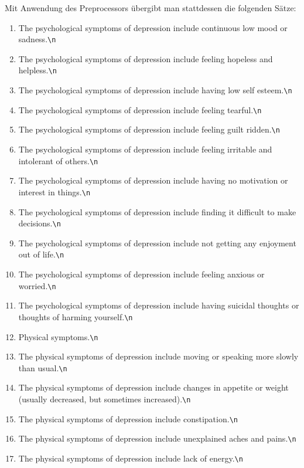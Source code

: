Mit Anwendung des Preprocessors übergibt man stattdessen die folgenden Sätze:
\begin{enumerate}
	\item \glqq The psychological symptoms of depression include continuous low mood or sadness.\verb!\n!\grqq
	\item \glqq The psychological symptoms of depression include feeling hopeless and helpless.\verb!\n!\grqq
	\item \glqq The psychological symptoms of depression include having low self esteem.\verb!\n!\grqq
	\item \glqq The psychological symptoms of depression include feeling tearful.\verb!\n!\grqq
	\item \glqq The psychological symptoms of depression include feeling guilt ridden.\verb!\n!\grqq
	\item \glqq The psychological symptoms of depression include feeling irritable and intolerant of others.\verb!\n!\grqq
	\item \glqq The psychological symptoms of depression include having no motivation or interest in things.\verb!\n!\grqq
	\item \glqq The psychological symptoms of depression include finding it difficult to make decisions.\verb!\n!\grqq
	\item \glqq The psychological symptoms of depression include not getting any enjoyment out of life.\verb!\n!\grqq
	\item \glqq The psychological symptoms of depression include feeling anxious or worried.\verb!\n!\grqq
	\item \glqq The psychological symptoms of depression include having suicidal thoughts or thoughts of harming yourself.\verb!\n!\grqq
	\item \glqq Physical symptoms.\verb!\n!\grqq
	\item \glqq The physical symptoms of depression include moving or speaking more slowly than usual.\verb!\n!\grqq
	\item \glqq The physical symptoms of depression include changes in appetite or weight (usually decreased, but sometimes increased).\verb!\n!\grqq
	\item \glqq The physical symptoms of depression include constipation.\verb!\n!\grqq
	\item \glqq The physical symptoms of depression include unexplained aches and pains.\verb!\n!\grqq
	\item \glqq The physical symptoms of depression include lack of energy.\verb!\n!\grqq

\end{enumerate}

